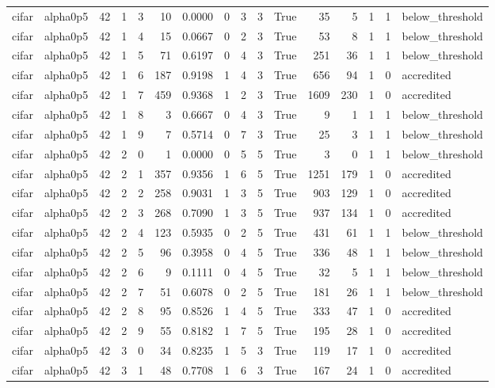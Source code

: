 \begin{tabular}{llrrrrrrrrrrrrrl}
cifar & alpha0p5 & 42 & 1 & 3 & 10 & 0.0000 & 0 & 3 & 3 & True & 35 & 5 & 1 & 1 & below\_threshold \\
cifar & alpha0p5 & 42 & 1 & 4 & 15 & 0.0667 & 0 & 2 & 3 & True & 53 & 8 & 1 & 1 & below\_threshold \\
cifar & alpha0p5 & 42 & 1 & 5 & 71 & 0.6197 & 0 & 4 & 3 & True & 251 & 36 & 1 & 1 & below\_threshold \\
cifar & alpha0p5 & 42 & 1 & 6 & 187 & 0.9198 & 1 & 4 & 3 & True & 656 & 94 & 1 & 0 & accredited \\
cifar & alpha0p5 & 42 & 1 & 7 & 459 & 0.9368 & 1 & 2 & 3 & True & 1609 & 230 & 1 & 0 & accredited \\
cifar & alpha0p5 & 42 & 1 & 8 & 3 & 0.6667 & 0 & 4 & 3 & True & 9 & 1 & 1 & 1 & below\_threshold \\
cifar & alpha0p5 & 42 & 1 & 9 & 7 & 0.5714 & 0 & 7 & 3 & True & 25 & 3 & 1 & 1 & below\_threshold \\
cifar & alpha0p5 & 42 & 2 & 0 & 1 & 0.0000 & 0 & 5 & 5 & True & 3 & 0 & 1 & 1 & below\_threshold \\
cifar & alpha0p5 & 42 & 2 & 1 & 357 & 0.9356 & 1 & 6 & 5 & True & 1251 & 179 & 1 & 0 & accredited \\
cifar & alpha0p5 & 42 & 2 & 2 & 258 & 0.9031 & 1 & 3 & 5 & True & 903 & 129 & 1 & 0 & accredited \\
cifar & alpha0p5 & 42 & 2 & 3 & 268 & 0.7090 & 1 & 3 & 5 & True & 937 & 134 & 1 & 0 & accredited \\
cifar & alpha0p5 & 42 & 2 & 4 & 123 & 0.5935 & 0 & 2 & 5 & True & 431 & 61 & 1 & 1 & below\_threshold \\
cifar & alpha0p5 & 42 & 2 & 5 & 96 & 0.3958 & 0 & 4 & 5 & True & 336 & 48 & 1 & 1 & below\_threshold \\
cifar & alpha0p5 & 42 & 2 & 6 & 9 & 0.1111 & 0 & 4 & 5 & True & 32 & 5 & 1 & 1 & below\_threshold \\
cifar & alpha0p5 & 42 & 2 & 7 & 51 & 0.6078 & 0 & 2 & 5 & True & 181 & 26 & 1 & 1 & below\_threshold \\
cifar & alpha0p5 & 42 & 2 & 8 & 95 & 0.8526 & 1 & 4 & 5 & True & 333 & 47 & 1 & 0 & accredited \\
cifar & alpha0p5 & 42 & 2 & 9 & 55 & 0.8182 & 1 & 7 & 5 & True & 195 & 28 & 1 & 0 & accredited \\
cifar & alpha0p5 & 42 & 3 & 0 & 34 & 0.8235 & 1 & 5 & 3 & True & 119 & 17 & 1 & 0 & accredited \\
cifar & alpha0p5 & 42 & 3 & 1 & 48 & 0.7708 & 1 & 6 & 3 & True & 167 & 24 & 1 & 0 & accredited \\

\end{tabular}
